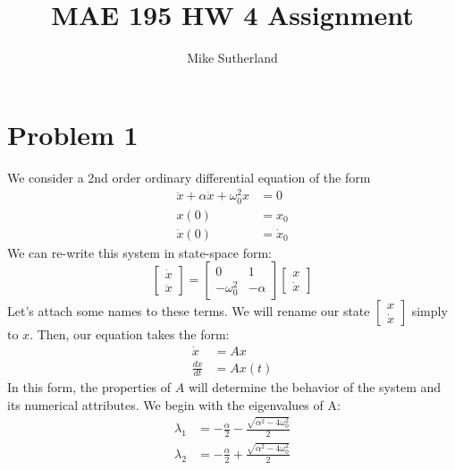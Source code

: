 \documentclass[10pt,letterpaper,notitlepage]{article}
\author{Mike Sutherland}
\title{MAE 195 HW 4 Assignment}
\begin{document}
    \maketitle
    \section{Problem 1}
    We consider a 2nd order ordinary differential equation of the form
    \begin{equation}
        \begin{aligned}
            \ddot{x} + \alpha \dot{x} + \omega_0^2 x &= 0 \\
            x(0) &= x_0 \\
            \dot{x}(0) &= \dot{x}_0
        \end{aligned}
        \label{eq:problem1}
    \end{equation}
    We can re-write this system in state-space form:
    \begin{equation}
        \begin{bmatrix}
            \dot{x} \\
            \ddot{x}
        \end{bmatrix}
        =
        \begin{bmatrix}
            0 & 1 \\
            -\omega_0^2 & -\alpha
        \end{bmatrix}
        \begin{bmatrix}
            x \\
            \dot{x}
        \end{bmatrix}
    \end{equation}
    Let's attach some names to these terms. We will rename our state $\begin{bmatrix}
        x \\
        \dot{x}
    \end{bmatrix}$ simply to $x$. Then, our equation takes the form:
    \begin{equation}
        \begin{aligned}
            \dot{x} &= A x \\
            \frac{dx}{dt} &= A x(t)
        \end{aligned}
    \end{equation}
    In this form, the properties of $A$ will determine the behavior of the system and its numerical attributes. We begin with the eigenvalues of A:
    \begin{equation}
        \begin{aligned}
            \lambda_1 &= -\frac{\alpha}{2} - \frac{\sqrt{\alpha^2 - 4 \omega_0^2}}{2} \\
            \lambda_2 &= -\frac{\alpha}{2} + \frac{\sqrt{\alpha^2 - 4 \omega_0^2}}{2}
        \end{aligned}
    \end{equation}
\end{document}
